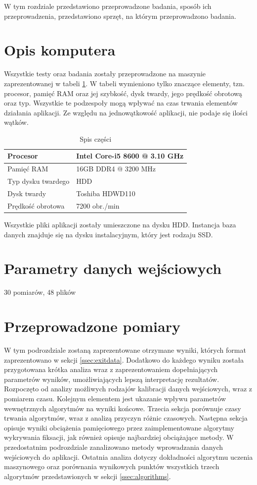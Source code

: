W tym rozdziale przedstawiono przeprowadzone badania, sposób ich przeprowadzenia, przedstawiono sprzęt, na którym przeprowadzono badania.
\section{Opis komputera}
Wszystkie testy oraz badania zostały przeprowadzone na maszynie zaprezentowanej w tabeli \ref{tab:machine}. W tabeli wymieniono tylko znaczące elementy, tzn. procesor, pamięć RAM oraz jej szybkość, dysk twardy, jego prędkość obrotową oraz typ. Wszystkie te podzespoły mogą wpływać na czas trwania elementów działania aplikacji. Ze względu na jednowątkowość aplikacji, nie podaje się ilości wątków.
\begin{table}[H]
    \centering
    \begin{tabular}{|l|l|}
        \hline
        Procesor       & Intel Core-i5 8600 @ 3.10 GHz          \\ \hline
        Pamięć RAM     & 16GB DDR4 @ 3200 MHz \\ \hline
        Typ dysku twardego           & HDD              \\ \hline
        Dysk twardy         & Toshiba HDWD110              \\ \hline
        Prędkość obrotowa         & 7200 obr./min              \\ \hline
    \end{tabular}
    \caption{Spis części}
    \label{tab:machine}
\end{table}
Wszystkie pliki aplikacji zostały umieszczone na dysku HDD. Instancja baza danych znajduje się na dysku instalacyjnym, który jest rodzaju SSD.
\section{Parametry danych wejściowych}
\label{sec:entryparamters}
30 pomiarów, 48 plików
\section{Przeprowadzone pomiary}
W tym podrozdziale zostaną zaprezentowane otrzymane wyniki, których format zaprezentowano w sekcji \ref{ssec:exitdata}. Dodatkowo do każdego wyniku została przygotowana krótka analiza wraz z zaprezentowaniem dopełniających parametrów wyników, umożliwiających lepszą interpretację rezultatów. Rozpoczęto od analizy możliwych rodzajów kalibracji danych wejściowych, wraz z pomiarem czasu. Kolejnym elementem jest ukazanie wpływu parametrów wewnętrznych algorytmów na wyniki końcowe. Trzecia sekcja porównuje czasy trwania algorytmów, wraz z analizą przyczyn różnic czasowych. Następna sekcja opisuje wyniki obciążenia pamięciowego przez zaimplementowane algorytmy wykrywania fiksacji, jak również opisuje najbardziej obciążające metody. W przedostatnim podrozdziale zanalizowano metody wprowadzania danych wejściowych do aplikacji. Ostatnia analiza dotyczy dokładności algorytmu uczenia maszynowego oraz porównania wynikowych punktów wszystkich trzech algorytmów przedstawionych w sekcji \ref{ssec:algorithms}.
